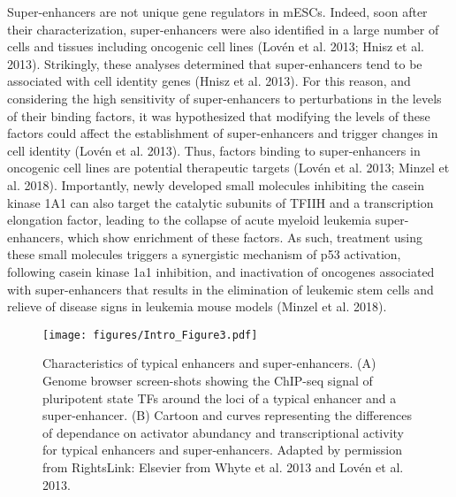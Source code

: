 Super-enhancers are not unique gene regulators in mESCs. Indeed, soon after their characterization, super-enhancers were also identified in a large number of cells and tissues including oncogenic cell lines (Lovén et al. 2013; Hnisz et al. 2013). Strikingly, these analyses determined that super-enhancers tend to be associated with cell identity genes (Hnisz et al. 2013). For this reason, and considering the high sensitivity of super-enhancers to perturbations in the levels of their binding factors, it was hypothesized that modifying the levels of these factors could affect the establishment of super-enhancers and trigger changes in cell identity (Lovén et al. 2013). Thus, factors binding to super-enhancers in oncogenic cell lines are potential therapeutic targets (Lovén et al. 2013; Minzel et al. 2018). Importantly, newly developed small molecules inhibiting the casein kinase 1A1 can also target the catalytic subunits of TFIIH and a transcription elongation factor, leading to the collapse of acute myeloid leukemia super-enhancers, which show enrichment of these factors. As such, treatment using these small molecules triggers a synergistic mechanism of p53 activation, following casein kinase 1a1 inhibition, and inactivation of oncogenes associated with super-enhancers that results in the elimination of leukemic stem cells and relieve of disease signs in leukemia mouse models (Minzel et al. 2018).\\


		\begin{figure}[h!]
			\centering
			\texttt{[image: figures/Intro\_Figure3.pdf]}
  			\caption[intro3]{Characteristics of typical enhancers and super-enhancers. (A) Genome browser screen-shots showing the ChIP-seq signal of pluripotent state TFs around the loci of a typical enhancer and a super-enhancer. (B) Cartoon and curves representing the differences of dependance on activator abundancy and transcriptional activity for typical enhancers and super-enhancers. Adapted by permission from RightsLink: Elsevier from Whyte et al. 2013 and Lov\'en et al. 2013.}
			\label{intro3}
		\end{figure}


